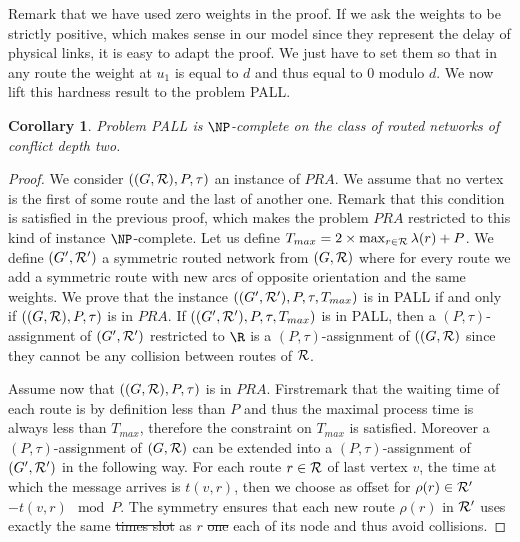 \documentclass[10pt, conference, letterpaper]{IEEEtran}
\newtheorem{corollary}{Corollary}
\providecommand{\DIFaddtex}[1]{{\protect\color{blue}\uwave{#1}}} %
\providecommand{\DIFdeltex}[1]{{\protect\color{red}\sout{#1}}}                      %
\providecommand{\DIFaddbegin}{} %
\providecommand{\DIFaddend}{} %
\providecommand{\DIFdelbegin}{} %
\providecommand{\DIFdelend}{} %
\providecommand{\DIFadd}[1]{\texorpdfstring{\DIFaddtex{#1}}{#1}} %
\providecommand{\DIFdel}[1]{\texorpdfstring{\DIFdeltex{#1}}{}} %
\newcommand{\DIFscaledelfig}{0.5}
\newlength{\DIFdelgraphicswidth} %
\newlength{\DIFdelgraphicsheight} %
\newcommand{\DIFaddincludegraphics}[2][]{{\color{blue}\fbox{\DIFOincludegraphics[#1]{#2}}}} %
\newcommand{\DIFdelincludegraphics}[2][]{%
\sbox{\DIFdelgraphicsbox}{\DIFOincludegraphics[#1]{#2}}%
\settoboxwidth{\DIFdelgraphicswidth}{\DIFdelgraphicsbox} %
\settoboxtotalheight{\DIFdelgraphicsheight}{\DIFdelgraphicsbox} %
\scalebox{\DIFscaledelfig}{%
\parbox[b]{\DIFdelgraphicswidth}{\usebox{\DIFdelgraphicsbox}\\[-\baselineskip] \rule{\DIFdelgraphicswidth}{0em}}\llap{\resizebox{\DIFdelgraphicswidth}{\DIFdelgraphicsheight}{%
\setlength{\unitlength}{\DIFdelgraphicswidth}%
\begin{picture}(1,1)%
\thicklines\linethickness{2pt} %
{\color[rgb]{1,0,0}\put(0,0){\framebox(1,1){}}}%
{\color[rgb]{1,0,0}\put(0,0){\line( 1,1){1}}}%
{\color[rgb]{1,0,0}\put(0,1){\line(1,-1){1}}}%
\end{picture}%
}\hspace*{3pt}}} %
} %
\DeclareRobustCommand{\DIFaddbegin}{\DIFOaddbegin \let\includegraphics\DIFaddincludegraphics} %
\DeclareRobustCommand{\DIFaddend}{\DIFOaddend \let\includegraphics\DIFOincludegraphics} %
\DeclareRobustCommand{\DIFdelbegin}{\DIFOdelbegin \let\includegraphics\DIFdelincludegraphics} %
\DeclareRobustCommand{\DIFdelend}{\DIFOaddend \let\includegraphics\DIFOincludegraphics} %
\begin{document}
 Remark that we have used zero weights in the proof. If we ask the weights to be strictly positive, which makes sense in our model since they represent the delay of physical links, it is easy to adapt the proof. We just have to set them so that in any route the weight at $u_1$ is equal to $d$ and thus equal to $0$ modulo $d$. We now lift this hardness result to the problem PALL.

\begin{corollary}
Problem PALL is $\NP$-complete on the class of routed networks of conflict depth two.
\end{corollary}
\begin{proof}
 We consider $((G,{\cal R}),P,\tau)$ an instance of $PRA$. We assume that no vertex is the first of some route and the last of another one. Remark that this condition is satisfied in the previous proof, which makes the problem $PRA$ restricted to this kind of instance $\NP$-complete. 
 Let us define $T_{max} = 2 \times \max_{r \in {\cal R}} \lambda(r) + P$. We define $(G',{\cal R}')$ a symmetric routed network from $(G,{\cal R})$ where for every route we add a symmetric route with new arcs of opposite orientation and the same weights.
 We prove that the instance $((G',{\cal R'}),P,\tau,T_{max})$ is in PALL if and only if $((G,{\cal R}),P,\tau)$ is in $PRA$.
 If $((G',{\cal R'}),P,\tau,T_{max})$ is in PALL, then a $(P,\tau)$-assignment of $(G',{\cal R'})$ restricted to $\R$ is a $(P,\tau)$-assignment of $((G,{\cal R})$ since they cannot be any collision between routes of ${\cal R}$.

 Assume now that $((G,{\cal R}),P,\tau)$ is in $PRA$. First\DIFaddbegin \DIFadd{, }\DIFaddend remark that the waiting time of each route is by definition less than $P$ and thus the maximal process time is always less than $T_{max}$, therefore the constraint on $T_{max}$ is satisfied. Moreover a $(P,\tau)$-assignment of $(G,{\cal R})$ can be extended into a $(P,\tau)$-assignment of $(G',{\cal R'})$ in the following way. For each route $r \in \cal{R}$ of last vertex $v$, the time at which the message arrives is $t(v,r)$, then we choose as offset for $\rho(r) \in \cal{R}'$ $-t(v,r) \mod P$. The symmetry ensures that each new route $\rho(r)$ in ${\cal R'}$ uses exactly the same \DIFdelbegin \DIFdel{times slot }\DIFdelend \DIFaddbegin \DIFadd{time slots }\DIFaddend as $r$ \DIFdelbegin \DIFdel{one }\DIFdelend \DIFaddbegin \DIFadd{on }\DIFaddend each of its node and thus avoid collisions.
\end{proof}
\end{document}

